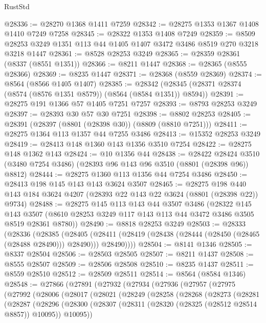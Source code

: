 \begin{lexlean}{RustStd}
\begin{coremodule}
@28336 := @28270 @1368 @1411 @7259
@28342 := @28275 @1353 @1367 @1408 @1410 @7249 @7258
@28345 := @28322 @1353 @1408 @7249
@28359 := @8509 @28253 @3249 @1351 @113 @44 @1405 @1407 @3472 @3486 @8519 @270 @3218 @3218 @1447
@28361 := @8528 @28253 @3249
@28365 := @28359 @28361 (@8337 (@8551 @1351))
@28366 := @8211 @1447
@28368 := @28365 (@8555 @28366)
@28369 := @8235 @1447
@28371 := @28368 (@8559 @28369)
@28374 := @8564 (@8566 @1405 @1407)
@28385 := @28342 (@28345 (@28371 @28374 (@8574 (@8576 @1351 @8579)) (@8564 (@8584 @1351)) @8594))
@28391 := @28275 @191 @1366 @57 @1405 @7251 @7257
@28393 := @8793 @28253 @3249
@28397 := @28393 @30 @57 @30 @7251
@28398 := @8802 @28253
@28405 := @28391 (@28397 (@8801 (@28398 @30)) (@8809 (@8810 @7251)))
@28411 := @28275 @1364 @113 @1357 @44 @7255 @3486
@28413 := @15352 @28253 @3249
@28419 := @28413 @148 @1360 @143 @1356 @3510 @7254
@28422 := @28275 @148 @1362 @143
@28424 := @10 @1356 @44
@28438 := @28422
    @28424
    @3510
    (@3480 @7254 @3486)
    (@28393 @96 @143 @96 @3510 (@8801 (@28398 @96)) @8812)
@28444 := @28275 @1360 @113 @1356 @44 @7254 @3486
@28450 := @28413 @198 @145 @143 @143 @3624 @3507
@28465 := @28275
    @198
    @440
    @143
    @184
    @3624
    @4207
    (@28393 @22 @143 @22 @3624 (@8801 (@28398 @22)) @9734)
@28488 := @28275
    @145
    @113
    @143
    @44
    @3507
    @3486
    (@28322
      @145
      @143
      @3507
      (@8610 @28253 @3249 @117 @143 @113 @44 @3472 @3486 @3505 @8519 @28361 @8780))
@28490 := @8818 @28253 @3249
@28503 := @28333
    (@28336
      (@28385
        (@28405
          (@28411 (@28419 (@28438 (@28444 (@28450 (@28465 (@28488 @28490))) @28490))) @28490))))
@28504 := @8141 @1346
@28505 := @8337 @28504
@28506 := @28503 @28505
@28507 := @8211 @1437
@28508 := @8555 @28507
@28509 := @28506 @28508
@28510 := @8235 @1437
@28511 := @8559 @28510
@28512 := @28509 @28511
@28514 := @8564 (@8584 @1346)
@28548 := @27866
    (@27891
      (@27932
        (@27934
          (@27936
            (@27957
              (@27975
                (@27992
                  (@28006
                    (@28017
                      (@28021
                        (@28249
                          (@28258
                            (@28268
                              (@28273
                                (@28281
                                  (@28287
                                    (@28296
                                      (@28300
                                        (@28307
                                          (@28311 (@28320 (@28325 (@28512 @28514 @8857)) @10095))
                                          @10095))

\end{coremodule}
\end{lexlean}
